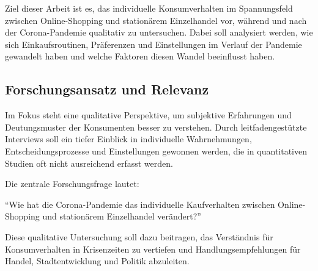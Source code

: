 Ziel dieser Arbeit ist es, das individuelle Konsumverhalten im Spannungsfeld zwischen Online-Shopping und stationärem Einzelhandel vor, während und nach der Corona-Pandemie qualitativ zu untersuchen. Dabei soll analysiert werden, wie sich Einkaufsroutinen, Präferenzen und Einstellungen im Verlauf der Pandemie gewandelt haben und welche Faktoren diesen Wandel beeinflusst haben. 

\subsection{Forschungsansatz und Relevanz}
Im Fokus steht eine qualitative Perspektive, um subjektive Erfahrungen und Deutungsmuster der Konsumenten besser zu verstehen. Durch leitfadengestützte Interviews soll ein tiefer Einblick in individuelle Wahrnehmungen, Entscheidungsprozesse und Einstellungen gewonnen werden, die in quantitativen Studien oft nicht ausreichend erfasst werden. 

Die zentrale Forschungsfrage lautet: 

\enquote{Wie hat die Corona-Pandemie das individuelle Kaufverhalten zwischen Online-Shopping und stationärem Einzelhandel verändert?}

Diese qualitative Untersuchung soll dazu beitragen, das Verständnis für Konsumverhalten in Krisenzeiten zu vertiefen und Handlungsempfehlungen für Handel, Stadtentwicklung und Politik abzuleiten. 